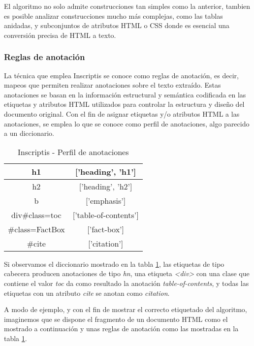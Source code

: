 El algoritmo no solo admite construcciones tan simples como la anterior, tambien es posible analizar 
construcciones mucho más complejas, como las tablas anidadas, y subconjuntos de atributos HTML o CSS donde 
es esencial una conversión precisa de HTML a texto.

\subsubsection{Reglas de anotación}
\label{subsubsec:reglas de anotacion}

La técnica que emplea Inscriptis se conoce como reglas de anotación, es decir, mapeos que permiten realizar 
anotaciones sobre el texto extraído. Estas anotaciones se basan en la información estructural y semántica 
codificada en las etiquetas y atributos HTML utilizados para controlar la estructura y diseño del documento 
original. Con el fin de asignar etiquetas y/o atributos HTML a las anotaciones, se emplea lo que se conoce 
como perfil de anotaciones, algo parecido a un diccionario. 


\begin{table}[h]
  \begin{center}
  \begin{tabular}{| c | c |} \hline 
    h1 & ['heading', 'h1'] \\ \hline
    h2 & ['heading', 'h2'] \\ \hline
    b & ['emphasis'] \\ \hline
    div\#class=toc & ['table-of-contents'] \\ \hline
    \#class=FactBox & ['fact-box'] \\ \hline
    \#cite & ['citation'] \\ \hline
  \end{tabular}
  \caption{Inscriptis - Perfil de anotaciones}
  \label{tab:inscriptis - perfil de anotaciones}
  \end{center}
\end{table}

Si observamos el diccionario mostrado en la tabla \ref{tab:inscriptis - perfil de anotaciones}, las 
etiquetas de tipo cabecera producen anotaciones de tipo \emph{hn}, una etiqueta \emph{<div>} con una 
clase que contiene el valor \emph{toc} da como resultado la anotación \emph{table-of-contents}, y todas 
las etiquetas con un atributo \emph{cite} se anotan como \emph{citation}.

A modo de ejemplo, y con el fin de mostrar el correcto etiquetado del algoritmo, imaginemos que se dispone 
el fragmento de un documento HTML como el mostrado a continuación y unas reglas de anotación como las 
mostradas en la tabla \ref{tab:inscriptis - perfil de anotaciones}.

